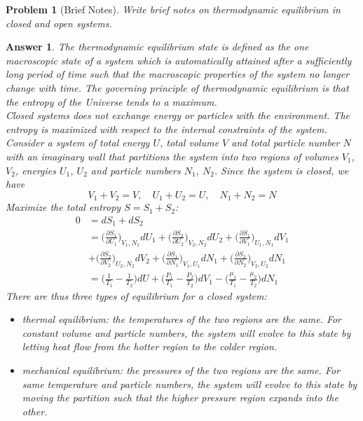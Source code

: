 \documentclass[a4paper]{article}
\newtheorem{ans}{Answer}[section]
\theoremstyle{new}
\newtheorem{qns}{Problem}[section]
\begin{document}
\begin{qns}[Brief Notes]
Write brief notes on thermodynamic equilibrium in closed and open systems.
\end{qns}
\begin{ans}
The thermodynamic equilibrium state is defined as the one macroscopic state of a system which is automatically attained after a sufficiently long period of time such that the macroscopic properties of the system no longer change with time. The governing principle of thermodynamic equilibrium is that the entropy of the Universe tends to a maximum.\\[5pt]
Closed systems does not exchange energy or particles with the environment. The entropy is maximized with respect to the internal constraints of the system. Consider a system of total energy $U$, total volume $V$ and total particle number $N$ with an imaginary wall that partitions the system into two regions of volumes $V_1$, $V_2$, energies $U_1$, $U_2$ and particle numbers $N_1$, $N_2$. Since the system is closed, we have
$$V_1+V_2=V,\quad U_1+U_2=U,\quad N_1+N_2=N$$
Maximize the total entropy $S=S_1+S_2$:
\begin{align}
    0&=dS_1+dS_2\nonumber\\&=\bigg(\frac{\partial S_1}{\partial U_1}\bigg)_{V_1,N_1}dU_1+\bigg(\frac{\partial S_2}{\partial U_2}\bigg)_{V_2,N_2}dU_2+\bigg(\frac{\partial S_1}{\partial V_1}\bigg)_{U_1,N_1}dV_1\nonumber\\&+\bigg(\frac{\partial S_2}{\partial V_2}\bigg)_{U_2,N_2}dV_2+\bigg(\frac{\partial S_1}{\partial N_1}\bigg)_{V_1,U_1}dN_1+\bigg(\frac{\partial S_2}{\partial N_2}\bigg)_{V_2,U_2}dN_1\nonumber\\&=\bigg(\frac{1}{T_1}-\frac{1}{T_2}\bigg)dU+\bigg(\frac{P_1}{T_1}-\frac{P_2}{T_2}\bigg)dV_1-\bigg(\frac{\mu_1}{T_1}-\frac{\mu_2}{T_2}\bigg)dN_1\nonumber
\end{align}
There are thus three types of equilibrium for a closed system:
\begin{itemize}
    \item thermal equilibrium: the temperatures of the two regions are the same. For constant volume and particle numbers, the system will evolve to this state by letting heat flow from the hotter region to the colder region.
    \item mechanical equilibrium: the pressures of the two regions are the same. For same temperature and particle numbers, the system will evolve to this state by moving the partition such that the higher pressure region expands into the other.

\end{itemize}
\end{ans}
\end{document}
